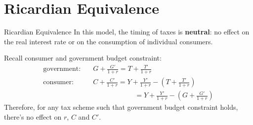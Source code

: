\documentclass[11pt,aspectratio=169,usenames,dvipsnames]{beamer}
\begin{document}
\section{Ricardian Equivalence}
\label{sec:Ricardian_Equivalence}

\begin{frame}{Ricardian Equivalence}
\label{slide:Ricardian_Equivalence}
    In this model, the timing of taxes is \textbf{neutral}: no effect on the real interest rate or on the consumption of individual consumers.

    Recall consumer and government budget constraint:
    \begin{align*}
        \text{government}: \quad
            & G + \frac{G'}{1+r} = T + \frac{T'}{1+r}
        \\
        \text{consumer}: \quad
            & C + \frac{C'}{1+r} = Y + \frac{Y'}{1+r} - \left( T + \frac{T'}{1+r} \right)
        \\
            &  \qquad \qquad \qquad = Y + \frac{Y'}{1+r} - \left( G + \frac{G'}{1+r} \right)
    \end{align*}
    Therefore, for any tax scheme such that government budget constraint holds, there's no effect on $ r $, $ C $ and $ C' $.
\end{frame}
\end{document}
